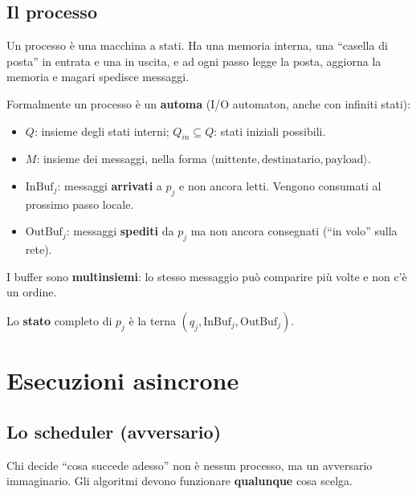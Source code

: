 \subsection{Il processo}

\begin{inbreve}

Un processo è una macchina a stati. Ha una memoria interna, una ``casella di posta'' in entrata e una in uscita, e ad ogni passo legge la posta, aggiorna la memoria e magari spedisce messaggi.

\end{inbreve}

Formalmente un processo è un \textbf{automa} (I/O automaton, anche con infiniti stati):

\begin{itemize}
\tightlist
\item
  \(Q\): insieme degli stati interni; \(Q_{in} \subseteq Q\): stati iniziali possibili.
\item
  \(M\): insieme dei messaggi, nella forma \(\langle \text{mittente}, \text{destinatario}, \text{payload} \rangle\).
\item
  \(\text{InBuf}_j\): messaggi \textbf{arrivati} a \(p_j\) e non ancora letti. Vengono consumati al prossimo passo locale.
\item
  \(\text{OutBuf}_j\): messaggi \textbf{spediti} da \(p_j\) ma non ancora consegnati (``in volo'' sulla rete).
\end{itemize}

I buffer sono \textbf{multinsiemi}: lo stesso messaggio può comparire più volte e non c'è un ordine.

Lo \textbf{stato} completo di \(p_j\) è la terna \((q_j, \text{InBuf}_j, \text{OutBuf}_j)\).

\section{Esecuzioni asincrone}

\subsection{Lo scheduler (avversario)}

\begin{inbreve}

Chi decide ``cosa succede adesso'' non è nessun processo, ma un avversario immaginario. Gli algoritmi devono funzionare \textbf{qualunque} cosa scelga.

\end{inbreve}

